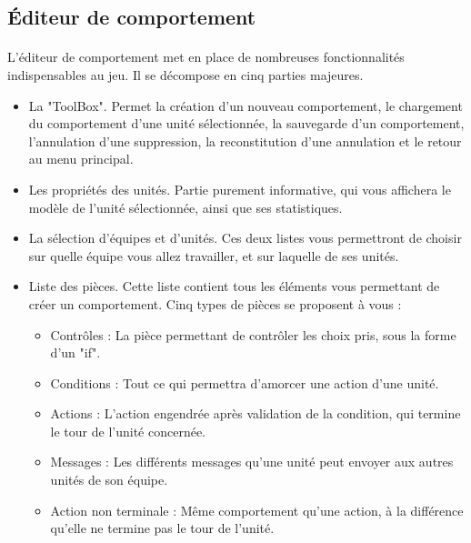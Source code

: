 \documentclass{article}
\begin{document}
\subsection{Éditeur de comportement}

\paragraph{}
L'éditeur de comportement met en place de nombreuses fonctionnalités indispensables au jeu.
Il se décompose en cinq parties majeures.
\begin{itemize}
	\item La "ToolBox". Permet la création d'un nouveau comportement, le chargement du comportement d'une unité sélectionnée, la sauvegarde d'un comportement, l'annulation d'une suppression, la reconstitution d'une annulation et le retour au menu principal.
	\item Les propriétés des unités. Partie purement informative, qui vous affichera le modèle de l'unité sélectionnée, ainsi que ses statistiques.
	\item La sélection d'équipes et d'unités. Ces deux listes vous permettront de choisir sur quelle équipe vous allez travailler, et sur laquelle de ses unités.
	\item Liste des pièces. Cette liste contient tous les éléments vous permettant de créer un comportement. Cinq types de pièces se proposent à vous :
		\begin{itemize}
			\item Contrôles : La pièce permettant de contrôler les choix pris, sous la forme d'un "if".
			\item Conditions : Tout ce qui permettra d'amorcer une action d'une unité. 
			\item Actions : L'action engendrée après validation de la condition, qui termine le tour de l'unité concernée.
			\item Messages : Les différents messages qu'une unité peut envoyer aux autres unités de son équipe.
			\item Action non terminale : Même comportement qu'une action, à la différence qu'elle ne termine pas le tour de l'unité.
	\end{itemize}
\end{itemize}



\end{document}
